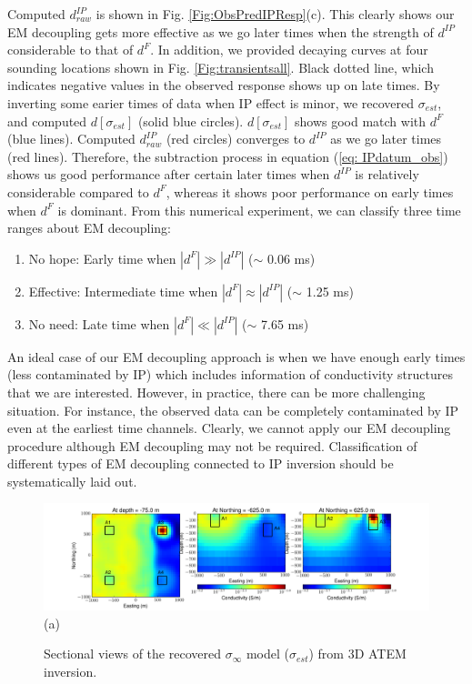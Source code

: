 \documentclass[letterpaper,11pt]{article}
\newcommand{\siginf}{\sigma_\infty}
\newcommand{\dip}{d^{IP}}
\begin{document}
Computed $\dip_{raw}$ is shown in Fig. \ref{Fig:ObsPredIPResp}(c). This clearly shows our EM decoupling gets more effective as we go later times when the strength of $\dip$ considerable to that of $d^F$. In addition, we provided decaying curves at four sounding locations shown in Fig. \ref{Fig:transientsall}. Black dotted line, which indicates negative values in the observed response shows up on late times. 
By inverting some earier times of data when IP effect is minor, we recovered $\sigma_{est}$, and computed $d[\sigma_{est}]$ (solid blue circles). $d[\sigma_{est}]$ shows good match with $d^F$ (blue lines). 
Computed $\dip_{raw}$ (red circles) converges to $\dip$ as we go later times (red lines).
Therefore, the subtraction process in equation (\ref{eq: IPdatum_obs}) shows us good performance after certain later times when $\dip$ is relatively considerable compared to $d^F$, whereas it shows poor performance on early times when $d^F$ is dominant. From this numerical experiment, we can classify three time ranges about EM decoupling:
\begin{enumerate}
  \item No hope: Early time when $|d^F| \gg |\dip|$ ($\sim$ 0.06 ms)
  \item Effective: Intermediate time when $|d^F| \approx |\dip|$ ($\sim$ 1.25 ms)
  \item No need: Late time when $|d^F| \ll |\dip|$ ($\sim$ 7.65 ms)
\end{enumerate}

An ideal case of our EM decoupling approach is when we have enough early times (less contaminated by IP) which includes information of conductivity structures that we are interested. However, in practice, there can be more challenging situation. For instance, the observed data can be completely contaminated by IP even at the earliest time channels. Clearly, we cannot apply our EM decoupling procedure although EM decoupling may not be required. Classification of different types of EM decoupling connected to IP inversion should be systematically laid out.

\begin{figure}[htb]
  \centering
  \includegraphics[width=1.0\textwidth]{figures/sigma_est.png}\\(a)
  \caption{Sectional views of the recovered $\siginf$ model ($\sigma_{est}$) from 3D ATEM inversion.}
  \label{Fig:condestmodel}
\end{figure}
\end{document}
